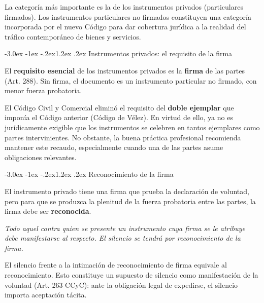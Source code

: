 \documentclass[12pt,oneside]{book}
\makeatletter
\renewcommand\section{\@startsection{section}{1}{\z@}%
  {-3.0ex \@plus -1ex \@minus -.2ex}{1.2ex \@plus .2ex}%
  {\normalfont\large\bfseries\color{acento}}}
\makeatother
\begin{document}
La categoría más importante es la de los instrumentos privados (particulares firmados). Los instrumentos particulares no firmados constituyen una categoría incorporada por el nuevo Código para dar cobertura jurídica a la realidad del tráfico contemporáneo de bienes y servicios.

\section{Instrumentos privados: el requisito de la firma}

\begin{importante}
El \textbf{requisito esencial} de los instrumentos privados es la \textbf{firma} de las partes (Art. 288). Sin firma, el documento es un instrumento particular no firmado, con menor fuerza probatoria.
\end{importante}

El Código Civil y Comercial eliminó el requisito del \textbf{doble ejemplar} que imponía el Código anterior (Código de Vélez). En virtud de ello, ya no es jurídicamente exigible que los instrumentos se celebren en tantos ejemplares como partes intervinientes. No obstante, la buena práctica profesional recomienda mantener este recaudo, especialmente cuando una de las partes asume obligaciones relevantes.

\section{Reconocimiento de la firma}

El instrumento privado tiene una firma que prueba la declaración de voluntad, pero para que se produzca la plenitud de la fuerza probatoria entre las partes, la firma debe ser \textbf{reconocida}.

\begin{regla}
\textit{Todo aquel contra quien se presente un instrumento cuya firma se le atribuye debe manifestarse al respecto. El silencio se tendrá por reconocimiento de la firma.}
\end{regla}

\begin{importante}
El silencio frente a la intimación de reconocimiento de firma equivale al reconocimiento. Esto constituye un supuesto de silencio como manifestación de la voluntad (Art. 263 CCyC): ante la obligación legal de expedirse, el silencio importa aceptación tácita.
\end{importante}
\end{document}

